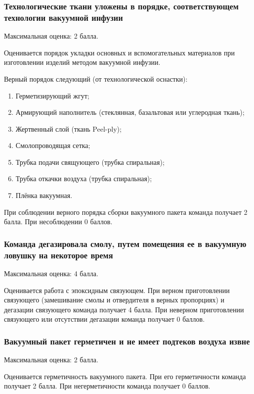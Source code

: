 \subsubsection*{Технологические ткани уложены в порядке, соответствующем технологии вакуумной инфузии}

Максимальная оценка: 2 балла.

Оценивается порядок укладки основных и вспомогательных материалов при изготовлении изделий методом вакуумной инфузии.

Верный порядок следующий (от технологической оснастки):
\begin{enumerate}
    \item Герметизирующий жгут;
    \item Армирующий наполнитель (стеклянная, базальтовая или углеродная ткань);
    \item Жертвенный слой (ткань Peel-ply);
    \item Смолопроводящая сетка;
    \item Трубка подачи свящующего (трубка спиральная);
    \item Трубка откачки воздуха (трубка спиральная);
    \item Плёнка вакуумная.
\end{enumerate}

При соблюдении верного порядка сборки вакуумного пакета команда получает 2 балла. При несоблюдении 0 баллов.

\subsubsection*{Команда дегазировала смолу, путем помещения ее в вакуумную ловушку на некоторое время}

Максимальная оценка: 4 балла.

Оценивается работа с эпоксидным связующем. При верном приготовлении связующего (замешивание смолы и отвердителя в верных пропорциях) и дегазации связующего команда получает 4 балла. При неверном приготовлении связующего или отсутствии дегазации команда получает 0 баллов.

\subsubsection*{Вакуумный пакет герметичен и не имеет подтеков воздуха извне}

Максимальная оценка: 2 балла.

Оценивается герметичность вакуумного пакета. При его герметичности команда получает 2 балла. При негерметичности команда получает 0 баллов.

